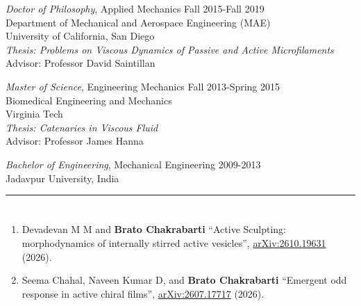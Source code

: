 \documentclass[10pt]{res} %
\begin{document}
\begin{resume}
\vspace*{4mm} %
{\sl Doctor of Philosophy}, 
Applied Mechanics   \hfill Fall 2015-Fall 2019 \\ 
Department of Mechanical and Aerospace Engineering (MAE) \\ 
University of California, San Diego \\
\textit{Thesis: Problems on Viscous Dynamics of Passive and Active Microfilaments} \\
Advisor: Professor David Saintillan 

 
{\sl Master of Science}, Engineering Mechanics \hfill Fall 2013-Spring 2015 \\
Biomedical Engineering and Mechanics \\ 
Virginia Tech \\
\textit{Thesis: Catenaries in Viscous Fluid} \\
Advisor: Professor James Hanna 


{\sl Bachelor of Engineering}, Mechanical Engineering \hfill 2009-2013 \\
Jadavpur University, India 

\vspace*{-3mm}


\noindent\rule{\textwidth}{0.6pt}
\vspace*{-10mm}
\section{}
\vspace*{7mm} %
\begin{enumerate}[topsep=0pt,itemsep= 1ex]


\item Devadevan M M and \textbf{Brato Chakrabarti} ``Active Sculpting: morphodynamics of internally stirred active vesicles'', \href{https://arxiv.org/abs/2610.19631}{arXiv:2610.19631} (2026).

\item Seema Chahal, Naveen Kumar D,  and \textbf{Brato Chakrabarti} ``Emergent odd response in active chiral films'', \href{https://arxiv.org/abs/2607.17717}{arXiv:2607.17717} (2026).


\end{enumerate}
\end{resume}
\end{document}
